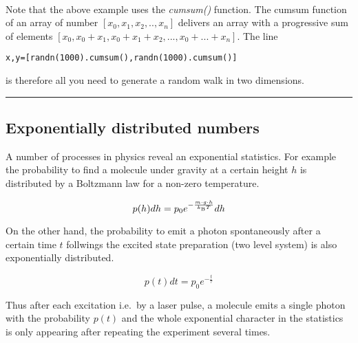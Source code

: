 \documentclass[11pt]{article}
\begin{document}
    \begin{center}
    \end{center}
    { \hspace*{\fill} \\}
    
    Note that the above example uses the \emph{cumsum()} function. The
cumsum function of an array of number \([x_0,x_1,x_2,..,x_n]\) delivers
an array with a progressive sum of elements
\([x_0,x_0+x_1,x_0+x_1+x_2,...,x_0+...+x_n]\). The line

\begin{verbatim}
x,y=[randn(1000).cumsum(),randn(1000).cumsum()]
\end{verbatim}

is therefore all you need to generate a random walk in two dimensions.

    \begin{center}\rule{0.5\linewidth}{\linethickness}\end{center}

\hypertarget{exponentially-distributed-numbers}{%
\subsection{Exponentially distributed
numbers}\label{exponentially-distributed-numbers}}

A number of processes in physics reveal an exponential statistics. For
example the probability to find a molecule under gravity at a certain
height \(h\) is distributed by a Boltzmann law for a non-zero
temperature.

\begin{equation}
    p(h)dh=p_{0}e^{-\frac{m\cdot g\cdot h}{k_{\rm B}T}}dh
\end{equation}

On the other hand, the probability to emit a photon spontaneously after
a certain time \(t\) follwings the excited state preparation (two level
system) is also exponentially distributed.

\begin{equation}
p(t)dt=p_{0}e^{-\frac{t}{\tau}}
\end{equation}

Thus after each excitation i.e.~by a laser pulse, a molecule emits a
single photon with the probability \(p(t)\) and the whole exponential
character in the statistics is only appearing after repeating the
experiment several times.
\end{document}
